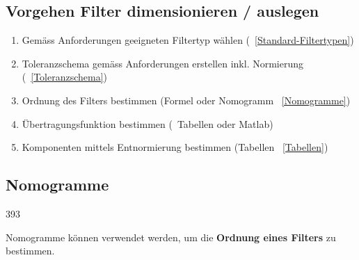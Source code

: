 \subsection{Vorgehen Filter dimensionieren / auslegen}

\begin{enumerate}
    \item Gemäss Anforderungen geeigneten Filtertyp wählen (\textrightarrow\ \ref{Standard-Filtertypen})
    \item Toleranzschema gemäss Anforderungen erstellen inkl. Normierung (\textrightarrow\ \ref{Toleranzschema})
    \item Ordnung des Filters bestimmen (Formel oder Nomogramm \textrightarrow\ \ref{Nomogramme})
    \item Übertragungsfunktion bestimmen (\textrightarrow\ Tabellen oder Matlab)
    \item Komponenten mittels Entnormierung bestimmen (Tabellen \textrightarrow\ \ref{Tabellen})
\end{enumerate}


\subsection{Nomogramme}{393}
\label{Nomogramme}

Nomogramme können verwendet werden, um die \textbf{Ordnung eines Filters}  zu bestimmen.

